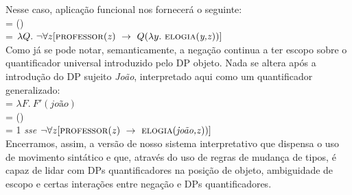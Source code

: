 \n Nesse caso, aplicação funcional nos fornecerá o seguinte:\\

\n  {} = ()\\

\n = $\lambda Q.\ \neg \forall z [\predica{professor}{z}\ \rightarrow\ Q(\lambda y.\ \predica{elogia}{y,z})]$ \\

\n Como já se pode notar, semanticamente, a negação continua a ter escopo sobre o quantificador universal introduzido pelo DP objeto. Nada se altera após a introdução do DP sujeito \textit{João}, interpretado aqui como um quantificador generalizado:\\

\n {} = $\lambda F.\ F'(\textit{joão})$ \\

\n  {} = ()\\

\n = 1 \textit{sse} $\neg \forall z [\predica{professor}{z}\ \rightarrow\ \predica{elogia}{joão,z})]$ \\


Encerramos, assim, a versão de nosso sistema interpretativo que
dispensa o uso de movimento sintático e que, através do uso de
regras de mudança de tipos, é capaz de lidar com DPs
quantificadores na posição de objeto, ambiguidade de escopo e
certas interações entre negação e DPs quantificadores.


\bigskip

